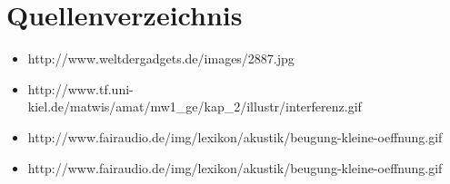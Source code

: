 \section{Quellenverzeichnis}
\begin{itemize}
\item http://www.weltdergadgets.de/images/2887.jpg
\item http://www.tf.uni-kiel.de/matwis/amat/mw1\_ge/kap\_2/illustr/interferenz.gif
\item http://www.fairaudio.de/img/lexikon/akustik/beugung-kleine-oeffnung.gif
\item http://www.fairaudio.de/img/lexikon/akustik/beugung-kleine-oeffnung.gif
\end{itemize}